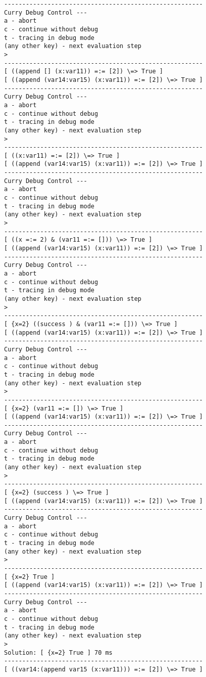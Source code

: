 \documentclass[titlepage,fleqn]{article}
\begin{document}
{\begin{verbatim}
-------------------------------------------------------
Curry Debug Control ---
a - abort
c - continue without debug
t - tracing in debug mode
(any other key) - next evaluation step
> 
-------------------------------------------------------
[ ((append [] (x:var11)) =:= [2]) \=> True ]
[ ((append (var14:var15) (x:var11)) =:= [2]) \=> True ]
-------------------------------------------------------
Curry Debug Control ---
a - abort
c - continue without debug
t - tracing in debug mode
(any other key) - next evaluation step
>
-------------------------------------------------------
[ ((x:var11) =:= [2]) \=> True ]
[ ((append (var14:var15) (x:var11)) =:= [2]) \=> True ]
-------------------------------------------------------
Curry Debug Control ---
a - abort
c - continue without debug
t - tracing in debug mode
(any other key) - next evaluation step
>
-------------------------------------------------------
[ ((x =:= 2) & (var11 =:= [])) \=> True ]
[ ((append (var14:var15) (x:var11)) =:= [2]) \=> True ]
-------------------------------------------------------
Curry Debug Control ---
a - abort
c - continue without debug
t - tracing in debug mode
(any other key) - next evaluation step
>
-------------------------------------------------------
[ {x=2} ((success ) & (var11 =:= [])) \=> True ]
[ ((append (var14:var15) (x:var11)) =:= [2]) \=> True ]
-------------------------------------------------------
Curry Debug Control ---
a - abort
c - continue without debug
t - tracing in debug mode
(any other key) - next evaluation step
>
-------------------------------------------------------
[ {x=2} (var11 =:= []) \=> True ]
[ ((append (var14:var15) (x:var11)) =:= [2]) \=> True ]
-------------------------------------------------------
Curry Debug Control ---
a - abort
c - continue without debug
t - tracing in debug mode
(any other key) - next evaluation step
>
-------------------------------------------------------
[ {x=2} (success ) \=> True ]
[ ((append (var14:var15) (x:var11)) =:= [2]) \=> True ]
-------------------------------------------------------
Curry Debug Control ---
a - abort
c - continue without debug
t - tracing in debug mode
(any other key) - next evaluation step
>
-------------------------------------------------------
[ {x=2} True ]
[ ((append (var14:var15) (x:var11)) =:= [2]) \=> True ]
-------------------------------------------------------
Curry Debug Control ---
a - abort
c - continue without debug
t - tracing in debug mode
(any other key) - next evaluation step
> 
Solution: [ {x=2} True ] 70 ms
-------------------------------------------------------
[ ((var14:(append var15 (x:var11))) =:= [2]) \=> True ]

\end{verbatim}}
\end{document}

